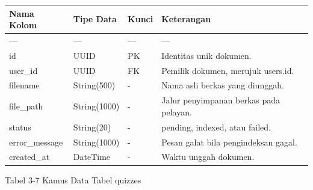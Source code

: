\documentclass[12pt,a4paper]{article}
\begin{document}
\begin{table}[h]

\centering

\begin{tabular}{llll}

\toprule

Nama Kolom & Tipe Data & Kunci & Keterangan \\

\midrule

--- & --- & --- & --- \\

id & UUID & PK & Identitas unik dokumen. \\

user\_id & UUID & FK & Pemilik dokumen, merujuk users.id. \\

filename & String(500) & - & Nama asli berkas yang diunggah. \\

file\_path & String(1000) & - & Jalur penyimpanan berkas pada pelayan. \\

status & String(20) & - & pending, indexed, atau failed. \\

error\_message & String(1000) & - & Pesan galat bila pengindeksan gagal. \\

created\_at & DateTime & - & Waktu unggah dokumen. \\

\bottomrule

\end{tabular}

\end{table}

Tabel 3-7	Kamus Data Tabel quizzes
\end{document}

